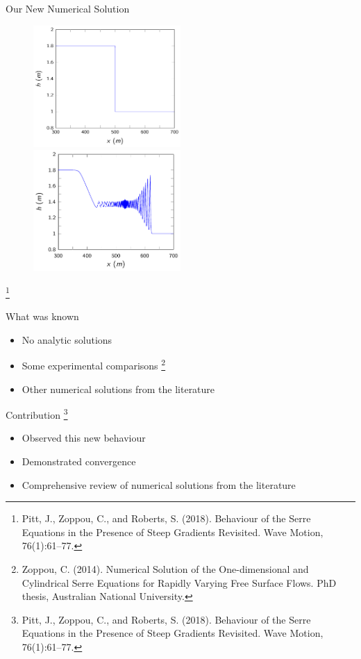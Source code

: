 \documentclass[]{beamer}
\newcommand\blfootnote[1]{%
	\begingroup
	\renewcommand\thefootnote{}\footnote{#1}%
	\addtocounter{footnote}{-1}%
	\endgroup
}
\begin{document}
\begin{frame}{Our New Numerical Solution}
	\begin{figure}
		\includegraphics[width=0.5\textwidth]{./Pics/SteepGradients/DBinit.pdf}
		\pause
		\includegraphics[width=0.5\textwidth]{./Pics/SteepGradients/DBfint.pdf}
	\end{figure}
	\blfootnote{Pitt, J., Zoppou, C., and Roberts, S. (2018).
		Behaviour of the Serre Equations in the Presence of Steep
		Gradients Revisited.
		Wave Motion, 76(1):61–77.}
\end{frame}

\begin{frame}{What was known}
	\begin{itemize}
		\item No analytic solutions
		\item Some experimental comparisons \footnote{Zoppou, C. (2014).
			Numerical Solution of the One-dimensional and Cylindrical
			Serre Equations for Rapidly Varying Free Surface Flows. PhD thesis, Australian National University.}
		\item Other numerical solutions from the literature
		\end{itemize}
\end{frame}

\begin{frame}{Contribution}
	\blfootnote{Pitt, J., Zoppou, C., and Roberts, S. (2018).
		Behaviour of the Serre Equations in the Presence of Steep
		Gradients Revisited.
		Wave Motion, 76(1):61–77.}
	\begin{itemize}
		\item Observed this new behaviour
		\item Demonstrated convergence
		\item Comprehensive review of numerical solutions from the literature
	\end{itemize}
	
\end{frame}
\end{document}
